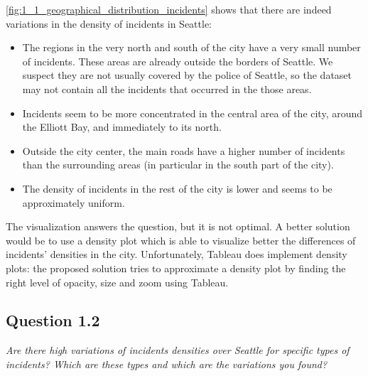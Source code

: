 \cref{fig:1_1_geographical_distribution_incidents} shows that there are indeed variations in the density of incidents in Seattle:
\begin{itemize}
    \item The regions in the very north and south of the city have a very small number of incidents. These areas are already outside the borders of Seattle. We suspect they are not usually covered by the police of Seattle, so the dataset may not contain all the incidents that occurred in the those areas.
    \item Incidents seem to be more concentrated in the central area of the city, around the Elliott Bay, and immediately to its north.
    \item Outside the city center, the main roads have a higher number of incidents than the surrounding areas (in particular in the south part of the city).
    \item The density of incidents in the rest of the city is lower and seems to be approximately uniform.
\end{itemize}

The visualization answers the question, but it is not optimal.
A better solution would be to use a density plot which is able to visualize better the differences of incidents' densities in the city.
Unfortunately, Tableau does implement density plots: the proposed solution tries to approximate a density plot by finding the right level of opacity, size and zoom using Tableau.

\subsection*{Question 1.2}
\textit{Are there high variations of incidents densities over Seattle for specific types of incidents? Which are these types and which are the variations you found?}

